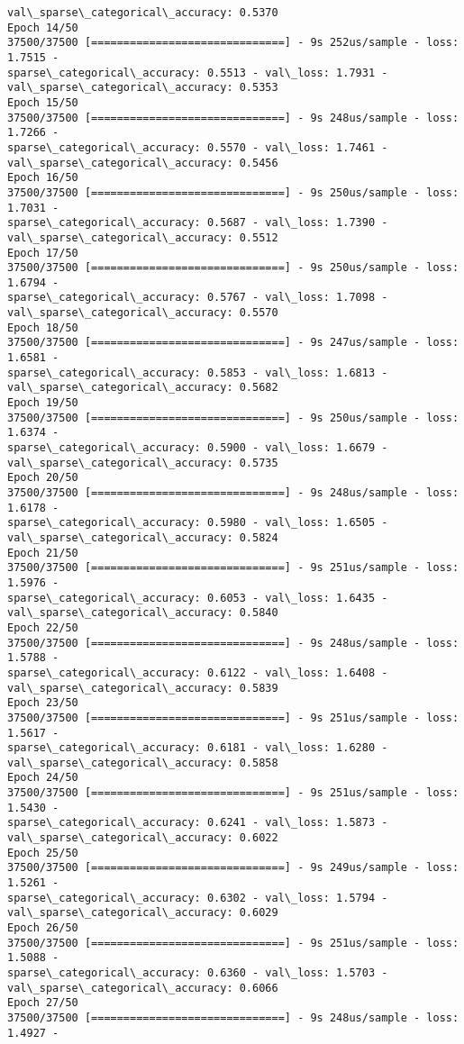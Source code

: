 \documentclass[11pt]{article}
\begin{document}
\begin{Verbatim}[commandchars=\\\{\}]
val\_sparse\_categorical\_accuracy: 0.5370
Epoch 14/50
37500/37500 [==============================] - 9s 252us/sample - loss: 1.7515 -
sparse\_categorical\_accuracy: 0.5513 - val\_loss: 1.7931 -
val\_sparse\_categorical\_accuracy: 0.5353
Epoch 15/50
37500/37500 [==============================] - 9s 248us/sample - loss: 1.7266 -
sparse\_categorical\_accuracy: 0.5570 - val\_loss: 1.7461 -
val\_sparse\_categorical\_accuracy: 0.5456
Epoch 16/50
37500/37500 [==============================] - 9s 250us/sample - loss: 1.7031 -
sparse\_categorical\_accuracy: 0.5687 - val\_loss: 1.7390 -
val\_sparse\_categorical\_accuracy: 0.5512
Epoch 17/50
37500/37500 [==============================] - 9s 250us/sample - loss: 1.6794 -
sparse\_categorical\_accuracy: 0.5767 - val\_loss: 1.7098 -
val\_sparse\_categorical\_accuracy: 0.5570
Epoch 18/50
37500/37500 [==============================] - 9s 247us/sample - loss: 1.6581 -
sparse\_categorical\_accuracy: 0.5853 - val\_loss: 1.6813 -
val\_sparse\_categorical\_accuracy: 0.5682
Epoch 19/50
37500/37500 [==============================] - 9s 250us/sample - loss: 1.6374 -
sparse\_categorical\_accuracy: 0.5900 - val\_loss: 1.6679 -
val\_sparse\_categorical\_accuracy: 0.5735
Epoch 20/50
37500/37500 [==============================] - 9s 248us/sample - loss: 1.6178 -
sparse\_categorical\_accuracy: 0.5980 - val\_loss: 1.6505 -
val\_sparse\_categorical\_accuracy: 0.5824
Epoch 21/50
37500/37500 [==============================] - 9s 251us/sample - loss: 1.5976 -
sparse\_categorical\_accuracy: 0.6053 - val\_loss: 1.6435 -
val\_sparse\_categorical\_accuracy: 0.5840
Epoch 22/50
37500/37500 [==============================] - 9s 248us/sample - loss: 1.5788 -
sparse\_categorical\_accuracy: 0.6122 - val\_loss: 1.6408 -
val\_sparse\_categorical\_accuracy: 0.5839
Epoch 23/50
37500/37500 [==============================] - 9s 251us/sample - loss: 1.5617 -
sparse\_categorical\_accuracy: 0.6181 - val\_loss: 1.6280 -
val\_sparse\_categorical\_accuracy: 0.5858
Epoch 24/50
37500/37500 [==============================] - 9s 251us/sample - loss: 1.5430 -
sparse\_categorical\_accuracy: 0.6241 - val\_loss: 1.5873 -
val\_sparse\_categorical\_accuracy: 0.6022
Epoch 25/50
37500/37500 [==============================] - 9s 249us/sample - loss: 1.5261 -
sparse\_categorical\_accuracy: 0.6302 - val\_loss: 1.5794 -
val\_sparse\_categorical\_accuracy: 0.6029
Epoch 26/50
37500/37500 [==============================] - 9s 251us/sample - loss: 1.5088 -
sparse\_categorical\_accuracy: 0.6360 - val\_loss: 1.5703 -
val\_sparse\_categorical\_accuracy: 0.6066
Epoch 27/50
37500/37500 [==============================] - 9s 248us/sample - loss: 1.4927 -

\end{Verbatim}
\end{document}
